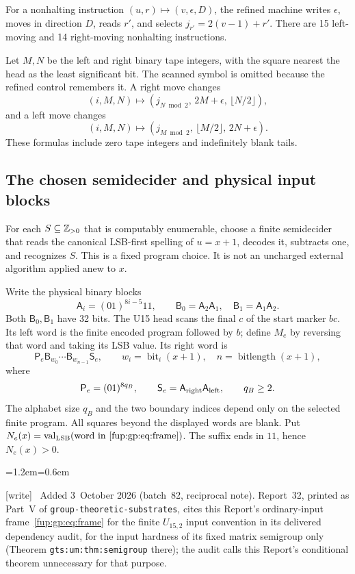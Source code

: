 \documentclass[11pt,letterpaper]{article}
\theoremstyle{definition}\newtheorem{definition}[theorem]{Definition}
\theoremstyle{remark}\newtheorem{remark}[theorem]{Remark}
\newcommand{\val}{\operatorname{val}_{\rm LSB}}
\newcommand{\bits}{\operatorname{bitlength}}
\newcommand{\wtag}{\textup{[write]}}
\newenvironment{writenote}{\par\smallskip\begin{list}{}{\leftmargin=1.2em\rightmargin=0.6em}\item[]\small\wtag\ }{\end{list}\smallskip}
\newcommand{\rw}[1]{\nolinkurl{#1}}%
\begin{document}
For a nonhalting instruction $(u,r)\mapsto(v,\epsilon,D)$, the refined machine writes $\epsilon$, moves in direction $D$, reads $r'$, and selects $j_{r'}=2(v-1)+r'$. There are 15 left-moving and 14 right-moving nonhalting instructions.

Let $M,N$ be the left and right binary tape integers, with the square nearest the head as the least significant bit. The scanned symbol is omitted because the refined control remembers it. A right move changes
\[
 (i,M,N)\mapsto(j_{N\bmod2},\,2M+\epsilon,\,\lfloor N/2\rfloor),
\]
and a left move changes
\[
 (i,M,N)\mapsto(j_{M\bmod2},\,\lfloor M/2\rfloor,\,2N+\epsilon).
\]
These formulas include zero tape integers and indefinitely blank tails.

\subsection{The chosen semidecider and physical input blocks}
For each $S\subseteq\mathbb Z_{>0}$ that is computably enumerable, choose a finite semidecider that reads the canonical LSB-first spelling of $u=x+1$, decodes it, subtracts one, and recognizes $S$. This is a fixed program choice. It is not an uncharged external algorithm applied anew to $x$.

Write the physical binary blocks
\[
 \mathsf A_i=(01)^{8i-5}11,\qquad
 \mathsf B_0=\mathsf A_2\mathsf A_1,\quad
 \mathsf B_1=\mathsf A_1\mathsf A_2.
\]
Both $\mathsf B_0,\mathsf B_1$ have 32 bits. The U15 head scans the final $c$ of the start marker $bc$. Its left word is the finite encoded program followed by $b$; define $M_e$ by reversing that word and taking its LSB value. Its right word is
\begin{equation}\label{fup:gp:eq:frame}
 \mathsf P_e\mathsf B_{w_0}\cdots\mathsf B_{w_{n-1}}\mathsf S_e,
 \qquad w_i=\operatorname{bit}_i(x+1),\quad n=\bits(x+1),
\end{equation}
where
\[
 \mathsf P_e=(01)^{8q_B},\qquad
 \mathsf S_e=\mathsf A_{\rm right}\mathsf A_{\rm left},\qquad q_B\ge2.
\]
The alphabet size $q_B$ and the two boundary indices depend only on the selected finite program. All squares beyond the displayed words are blank. Put $N_e(x)=\val(\text{word in \eqref{fup:gp:eq:frame}})$. The suffix ends in $11$, hence $N_e(x)>0$.

\begin{writenote}
Added 3~October 2026 (batch~82, reciprocal note). Report~32, printed as Part~V of \rw{group-theoretic-substrates}, cites this Report's ordinary-input frame~\eqref{fup:gp:eq:frame} for the finite $U_{15,2}$ input convention in its delivered dependency audit, for the input hardness of its fixed matrix semigroup only (Theorem \rw{gts:um:thm:semigroup} there); the audit calls this Report's conditional theorem unnecessary for that purpose.
\end{writenote}
\end{document}

